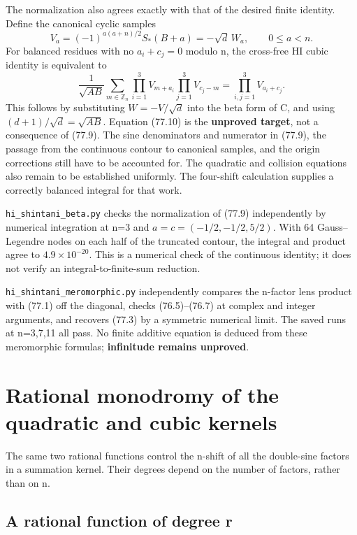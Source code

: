 \documentclass[11pt,reqno]{amsart}
\theoremstyle{plain}
\begin{document}
The normalization also agrees exactly with that of the desired finite
identity. Define the canonical cyclic samples
\[
 V_a=(-1)^{a(a+n)/2}S_*(B+a)=-\sqrt d\,W_a,
 \qquad 0\le a<n.
\]
For balanced residues with no \(a_i+c_j=0\) modulo n, the cross-free
HI cubic identity is equivalent to
\begin{equation*}
 \boxed{\displaystyle
 \frac1{\sqrt{AB}}\sum_{m\in\mathbb Z_n}
   \prod_{i=1}^3V_{m+a_i}\prod_{j=1}^3V_{c_j-m}
 =\prod_{i,j=1}^3V_{a_i+c_j}.}
 \tag{77.10}
\end{equation*}
This follows by substituting \(W=-V/\sqrt d\) into the beta form
of C, and using \((d+1)/\sqrt d=\sqrt{AB}\).
Equation (77.10) is the \textbf{unproved target}, not a consequence of
(77.9). The sine denominators and numerator in (77.9), the passage
from the continuous contour to canonical samples, and the origin
corrections still have to be accounted for. The quadratic and collision
equations also remain to be established uniformly. The four-shift
calculation supplies a correctly balanced integral for that work.

\texttt{hi\_\allowbreak shintani\_\allowbreak beta.py} checks the normalization of (77.9) independently
by numerical integration at n=3 and
\(a=c=(-1/2,-1/2,5/2)\). With 64 Gauss--Legendre nodes on each
half of the truncated contour, the integral and product agree to
\(4.9\times10^{-20}\). This is a numerical check of the continuous
identity; it does not verify an integral-to-finite-sum reduction.

\texttt{hi\_\allowbreak shintani\_\allowbreak meromorphic.py} independently compares the n-factor lens
product with (77.1) off the diagonal, checks (76.5)--(76.7) at complex
and integer arguments, and recovers (77.3) by a symmetric numerical
limit. The saved runs at n=3,7,11 all pass. No finite additive equation
is deduced from these meromorphic formulas; \textbf{infinitude remains
unproved}.

\section{Rational monodromy of the quadratic and cubic kernels}\label{sec:78}

The same two rational functions control the n-shift of all the
double-sine factors in a summation kernel. Their degrees depend on
the number of factors, rather than on n.

\subsection{A rational function of degree r}\label{sec:78.1}
\end{document}
